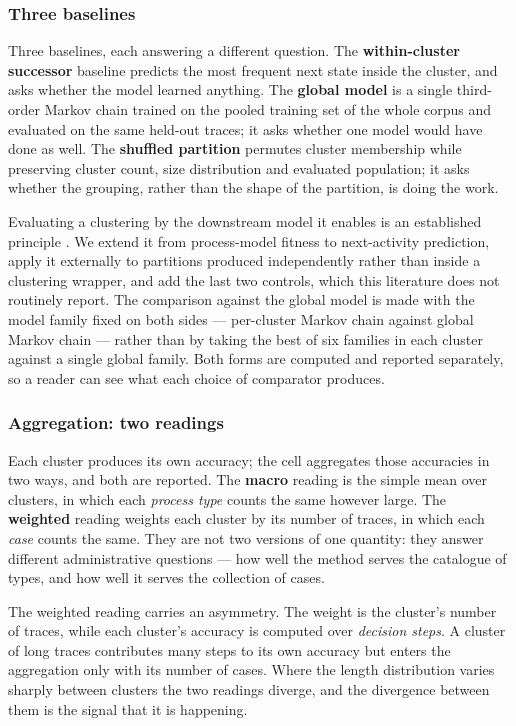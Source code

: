 \subsubsection*{Three baselines}

Three baselines, each answering a different question. The \textbf{within-cluster successor}
baseline predicts the most frequent next state inside the cluster, and asks whether the model
learned anything. The \textbf{global model} is a single third-order Markov chain trained on the
pooled training set of the whole corpus and evaluated on the same held-out traces; it asks
whether one model would have done as well. The \textbf{shuffled partition} permutes cluster
membership while preserving cluster count, size distribution and evaluated population; it asks
whether the grouping, rather than the shape of the partition, is doing the work.

Evaluating a clustering by the downstream model it enables is an established principle
\citep{deweerdt2013actitrac}. We extend it from process-model fitness to next-activity
prediction, apply it externally to partitions produced independently rather than inside a
clustering wrapper, and add the last two controls, which this literature does not routinely
report. The comparison against the global model is made with the model family fixed on both
sides --- per-cluster Markov chain against global Markov chain --- rather than by taking the best
of six families in each cluster against a single global family. Both forms are computed and
reported separately, so a reader can see what each choice of comparator produces.

\subsubsection*{Aggregation: two readings}

Each cluster produces its own accuracy; the cell aggregates those accuracies in two ways, and
both are reported. The \textbf{macro} reading is the simple mean over clusters, in which each
\emph{process type} counts the same however large. The \textbf{weighted} reading weights each
cluster by its number of traces, in which each \emph{case} counts the same. They are not two
versions of one quantity: they answer different administrative questions --- how well the method
serves the catalogue of types, and how well it serves the collection of cases.

The weighted reading carries an asymmetry. The weight is the cluster's number of traces, while
each cluster's accuracy is computed over \emph{decision steps}. A cluster of long traces
contributes many steps to its own accuracy but enters the aggregation only with its number of
cases. Where the length distribution varies sharply between clusters the two readings diverge,
and the divergence between them is the signal that it is happening.

